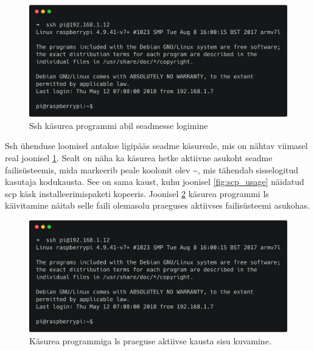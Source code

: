 \documentclass[12pt]{article}
\begin{document}
  \begin{figure} [ht] %
  \begin{center}
  \includegraphics[width=1.0\textwidth]{ssh_usage}
  \caption{Ssh käsurea programmi abil seadmesse logimine}
  \label{fig:ssh_usage}
  \end{center}
  \end{figure}
 
  \FloatBarrier
 
  Ssh ühenduse loomisel antakse ligipääs seadme käsureale, mis on nähtav viimasel real joonisel
  \ref{fig:ssh_usage}. Sealt on näha ka käsurea hetke aktiivne asukoht seadme failisüsteemis, mida markeerib
  peale koolonit olev \textasciitilde, mis tähendab sisselogitud kasutaja kodukausta. See on sama
  kaust, kuhu joonisel \ref{fig:scp_usage} näidatud scp käsk installeerimispaketi kopeeris.
  Joonisel \ref{fig:ls_usage} käsurea programmi ls käivitamine näitab selle faili olemasolu
  praeguses aktiivses failisüsteemi asukohas.
 
  \begin{figure} [ht] %
  \begin{center}
  \includegraphics[width=1.0\textwidth]{ssh_usage}
  \caption{Käsurea programmiga ls praeguse aktiivse kausta sisu kuvamine.}
  \label{fig:ls_usage}
  \end{center}
  \end{figure}
 
\end{document}
